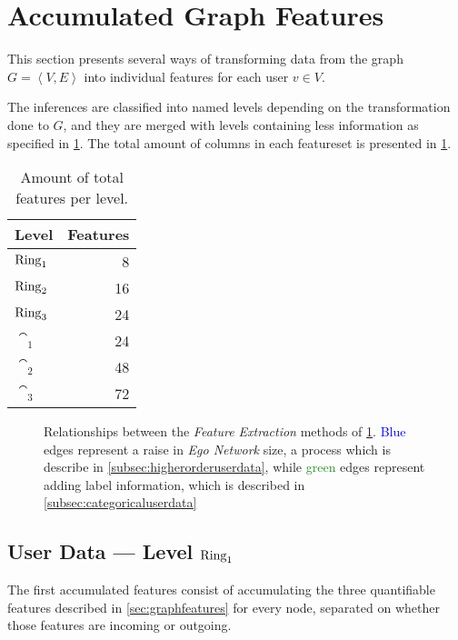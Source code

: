 \section{Accumulated Graph Features}
\label{sec:accumulatedfeatures}

This section presents several ways of transforming data from the graph $G = \left< V, E \right>$ into individual features for each user $v \in V$.

The inferences are classified into named levels depending on the transformation done to $G$, and they are merged with levels containing less information as specified in \cref{fig:mlrelationships}. The total amount of columns in each featureset is presented in \cref{tab:features}.

\begin{table}
\centering
\begin{tabular}{>{\bfseries}l r}
\toprule
Level & Features \\
\midrule
$\operatorname{Ring}_1$ & \num{8}  \\
$\operatorname{Ring}_2$ & \num{16} \\
$\operatorname{Ring}_3$ & \num{24} \\
$\cat_1$ & \num{24} \\
$\cat_2$ & \num{48} \\
$\cat_3$ & \num{72} \\
\bottomrule
\end{tabular}
\caption{Amount of total features per level.}
\label{tab:features}
\end{table}

\begin{figure}
\centering
\resizebox{!}{.2\textheight}{%
	\framebox{%
		
	}
}
\caption{Relationships between the \emph{Feature Extraction} methods of \cref{sec:accumulatedfeatures}. \textcolor{Blue}{Blue} edges represent a raise in \emph{Ego Network} size, a process which is describe in \cref{subsec:higherorderuserdata}, while \textcolor{ForestGreen}{green} edges represent adding label information, which is described in \cref{subsec:categoricaluserdata}}
\label{fig:mlrelationships}
\end{figure}

\subsection{User Data --- Level $\operatorname{Ring}_1$}
\label{subsec:user_data}

The first accumulated features consist of accumulating the three quantifiable features described in \cref{sec:graphfeatures} for every node, separated on whether those features are incoming or outgoing.

